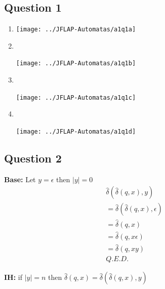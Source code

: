 \documentclass[12pt,a4paper]{article}
\begin{document}
	
	\subsection*{Question 1}
	\begin{enumerate}
		\item
			\begin{center}
				\texttt{[image: ../JFLAP-Automatas/a1q1a]}
			\end{center}
		\item  ~\\		
			\begin{center}
				\texttt{[image: ../JFLAP-Automatas/a1q1b]}
			\end{center}
		
		\begingroup{}
		\item  	~\\ 
		\begin{center}
			\texttt{[image: ../JFLAP-Automatas/a1q1c]}
		\end{center}
		\item  ~\\		
		\begin{center}
			\texttt{[image: ../JFLAP-Automatas/a1q1d]}
		\end{center}
		\endgroup
	\end{enumerate}

	\subsection*{Question 2}
		\noindent
		\textbf{Base:} Let $ y=\epsilon $ then $ |y|=0$
		\begin{align*}
			&\hat{\delta}(\hat{\delta}(q,x),y)		\tag{assumption}
			\\ &=\hat{\delta}(\hat{\delta}(q,x),\epsilon)	\tag{definition}
			\\ &=\hat{\delta}(q,x)					\tag{definition}
			\\ &=\hat{\delta}(q,x\epsilon)			\tag{definition}
			\\ &=\hat{\delta}(q,xy) 				\tag{assumption}
			\\ &Q.E.D.
		\end{align*}
		
		\noindent
		\textbf{IH:} if $|y|=n$ then $\hat{\delta}(q,x)=\hat{\delta}(\hat{\delta}(q,x),y)$\\
		
\end{document}
